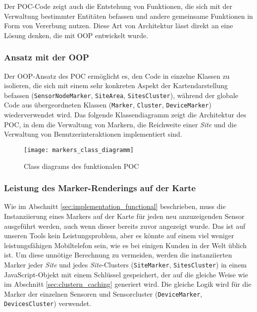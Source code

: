 Der POC-Code zeigt auch die Entstehung von Funktionen, die sich mit der Verwaltung bestimmter Entitäten befassen und andere gemeinsame Funktionen in Form von Vererbung nutzen.
Diese Art von Architektur lässt direkt an eine Lösung denken, die mit \ac{OOP} entwickelt wurde.

\subsubsection{Ansatz mit der \ac{OOP}}

Der \ac{OOP}-Ansatz des \ac{POC} ermöglicht es, den Code in einzelne Klassen zu isolieren, die sich mit einem sehr konkreten Aspekt der Kartendarstellung befassen (\lstinline{SensorNodeMarker}, \lstinline{SiteArea}, \lstinline{SitesCluster}), während der globale Code aus übergeordneten Klassen (\lstinline{Marker}, \lstinline{Cluster}, \lstinline{DeviceMarker}) wiederverwendet wird.
Das folgende Klassendiagramm zeigt die Architektur des \ac{POC}, in dem die Verwaltung von Markern, die Reichweite einer \textit{Site} und die Verwaltung von Benutzerinteraktionen implementiert sind.

\begin{figure}[H]
  \centering
  \texttt{[image: markers\_class\_diagramm]}
  \caption{Class diagrams des funktionalen POC}
  \label{fig:markers_class_diagramm}
\end{figure}

\subsubsection{Leistung des Marker-Renderings auf der Karte}

Wie im Abschnitt \ref{sec:implementation_functional} beschrieben, muss die Instanziierung eines Markers auf der Karte für jeden neu anzuzeigenden Sensor ausgeführt werden, auch wenn dieser bereits zuvor angezeigt wurde.
Das ist auf unseren Tools kein Leistungsproblem, aber es könnte auf einem viel weniger leistungsfähigen Mobiltelefon sein, wie es bei einigen Kunden in der Welt üblich ist.
Um diese unnötige Berechnung zu vermeiden, werden die instanziierten Marker jeder \textit{Site} und jedes \textit{Site}-Clusters (\lstinline{SiteMarker}, \lstinline{SitesCluster}) in einem JavaScript-Objekt mit einem Schlüssel gespeichert, der auf die gleiche Weise wie im Abschnitt \ref{sec:clustern_caching} generiert wird.
Die gleiche Logik wird für die Marker der einzelnen Sensoren und Sensorcluster (\lstinline{DeviceMarker}, \lstinline{DevicesCluster}) verwendet.

